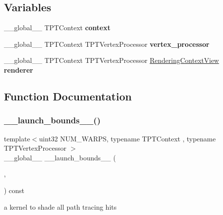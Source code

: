\subsection*{Variables}
\begin{DoxyCompactItemize}
\item 
\mbox{\label{group___p_t_lib_gad1b309ea79b3dd65eba4d029255b056d}} 
\+\_\+\+\_\+global\+\_\+\+\_\+ T\+P\+T\+Context {\bfseries context}
\item 
\mbox{\label{group___p_t_lib_ga1b659d1eb27ee1514ee1701d9c4c122e}} 
\+\_\+\+\_\+global\+\_\+\+\_\+ T\+P\+T\+Context T\+P\+T\+Vertex\+Processor {\bfseries vertex\+\_\+processor}
\item 
\+\_\+\+\_\+global\+\_\+\+\_\+ T\+P\+T\+Context T\+P\+T\+Vertex\+Processor \hyperlink{struct_rendering_context_view}{Rendering\+Context\+View} {\bfseries renderer}
\end{DoxyCompactItemize}


\subsection{Function Documentation}
\mbox{\label{group___p_t_lib_ga0a753a84987b59dab9b11e077e72c26b}} 
\subsubsection{\texorpdfstring{\+\_\+\+\_\+launch\+\_\+bounds\+\_\+\+\_\+()}{\_\_launch\_bounds\_\_()}}
{\footnotesize\ttfamily template$<$uint32 N\+U\+M\+\_\+\+W\+A\+R\+PS, typename T\+P\+T\+Context , typename T\+P\+T\+Vertex\+Processor $>$ \\
\+\_\+\+\_\+global\+\_\+\+\_\+ \+\_\+\+\_\+launch\+\_\+bounds\+\_\+\+\_\+ (\begin{DoxyParamCaption}\item[{S\+H\+A\+D\+E\+\_\+\+H\+I\+T\+S\+\_\+\+B\+L\+O\+C\+K\+S\+I\+ZE}]{,  }\item[{S\+H\+A\+D\+E\+\_\+\+H\+I\+T\+S\+\_\+\+C\+T\+A\+\_\+\+B\+L\+O\+C\+KS}]{ }\end{DoxyParamCaption}) const}

a kernel to shade all path tracing hits


